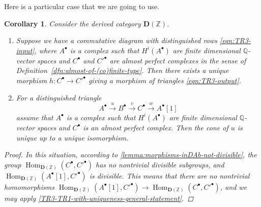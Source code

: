 \documentclass[leqno,12pt]{article}
\theoremstyle{plain}
\newtheorem{corollary}[theorem]{\indent\sc Corollary}
\theoremstyle{definition}
\DeclareMathOperator{\Hom}{Hom}
\newcommand{\ZZ}{\mathbb{Z}}
\newcommand{\QQ}{\mathbb{Q}}
\begin{document}
Here is a particular case that we are going to use.

\begin{corollary}
  \label{TR3-TR1-with-uniqueness}
  Consider the derived category $\mathbf{D} (\ZZ)$.

  \begin{enumerate}
  \item[$1)$] Suppose we have a commutative diagram with distinguished rows
    \eqref{eqn:TR3-input}, where $A^\bullet$ is a complex such that
    $H^i (A^\bullet)$ are finite dimensional $\QQ$-vector spaces and
    $C^\bullet$ and $C'^\bullet$ are almost perfect complexes in the sense of
    Definition~{\rm\ref{dfn:almost-of-(co)finite-type}}. Then there exists a unique
    morphism ${h\colon C^\bullet \to C'^\bullet}$ giving a morphism of triangles
    \eqref{eqn:TR3-output}.

  \item[$2)$] For a distinguished triangle
    $$A^\bullet \xrightarrow{u} B^\bullet \xrightarrow{v} C^\bullet \xrightarrow{w} A^\bullet[1]$$
    assume that $A^\bullet$ is a complex such that $H^i (A^\bullet)$ are finite
    dimensional $\QQ$-vector spaces and $C^\bullet$ is an almost perfect
    complex. Then the cone of $u$ is unique up to a unique isomorphism.
  \end{enumerate}

  \begin{proof}
    In this situation, according to \ref{lemma:morphisms-inDAb-not-divisible},
    the group $\Hom_{\mathbf{D} (\ZZ)} (C^\bullet, C'^\bullet)$ has no
    nontrivial divisible subgroups, and
    $\Hom_{\mathbf{D} (\ZZ)} (A^\bullet [1], C'^\bullet)$ is divisible. This
    means that there are no nontrivial homomorphisms
    $\Hom_{\mathbf{D} (\ZZ)} (A^\bullet [1], C'^\bullet) \to \Hom_{\mathbf{D} (\ZZ)} (C^\bullet, C'^\bullet)$,
    and we may apply \ref{TR3-TR1-with-uniqueness-general-statement}.
  \end{proof}
\end{corollary}
\end{document}
